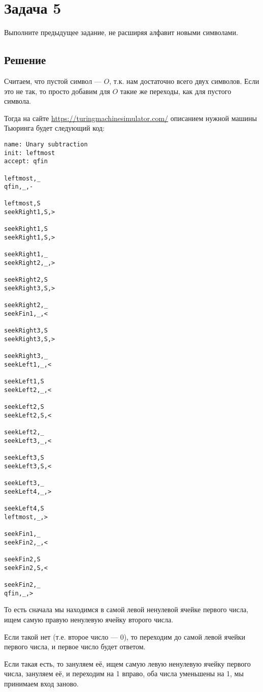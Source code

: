 \section{Задача 5}
Выполните предыдущее задание, не расширяя алфавит новыми символами.

\subsection{Решение}
Считаем, что пустой символ --- $O$, т.к.
нам достаточно всего двух символов.
Если это не так, то просто добавим для $O$
такие же переходы, как для пустого символа.

Тогда на сайте \url{https://turingmachinesimulator.com/}
описанием нужной машины Тьюринга будет следующий код:
\begin{verbatim}
name: Unary subtraction
init: leftmost
accept: qfin

leftmost,_
qfin,_,-

leftmost,S
seekRight1,S,>

seekRight1,S
seekRight1,S,>

seekRight1,_
seekRight2,_,>

seekRight2,S
seekRight3,S,>

seekRight2,_
seekFin1,_,<

seekRight3,S
seekRight3,S,>

seekRight3,_
seekLeft1,_,<

seekLeft1,S
seekLeft2,_,<

seekLeft2,S
seekLeft2,S,<

seekLeft2,_
seekLeft3,_,<

seekLeft3,S
seekLeft3,S,<

seekLeft3,_
seekLeft4,_,>

seekLeft4,S
leftmost,_,>

seekFin1,_
seekFin2,_,<

seekFin2,S
seekFin2,S,<

seekFin2,_
qfin,_,>
\end{verbatim}

То есть сначала мы находимся в самой левой ненулевой ячейке первого числа,
ищем самую правую ненулевую ячейку второго числа.

Если такой нет (т.е. второе число --- 0),
то переходим до самой левой ячейки первого
числа, и первое число будет ответом.

Если такая есть, то зануляем её, ищем самую левую ненулевую
ячейку первого числа, зануляем её, и переходим на 1 вправо,
оба числа уменьшены на 1, мы принимаем вход заново.

